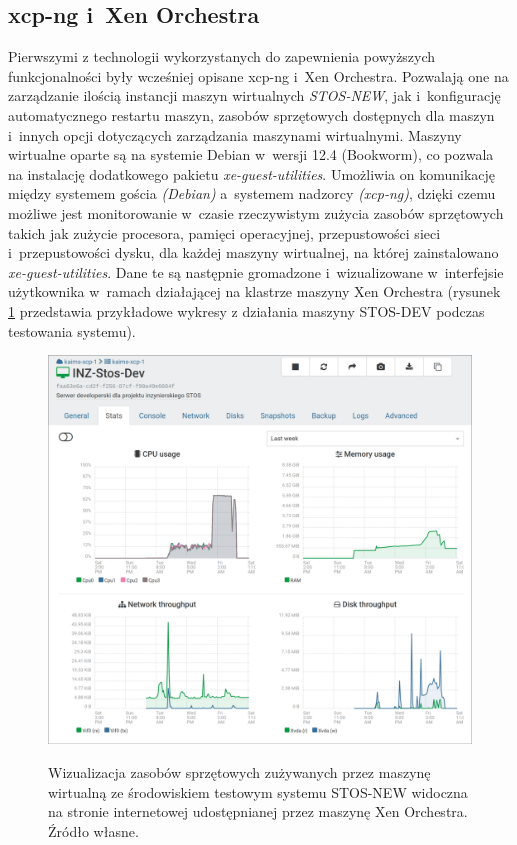 \subsection{xcp-ng i~Xen Orchestra}
Pierwszymi z technologii wykorzystanych do zapewnienia powyższych funkcjonalności były wcześniej opisane xcp-ng i~Xen Orchestra. Pozwalają one na zarządzanie ilością instancji maszyn wirtualnych \textit{STOS-NEW}, jak i~konfigurację automatycznego restartu maszyn, zasobów sprzętowych dostępnych dla maszyn i~innych opcji dotyczących zarządzania maszynami wirtualnymi\cite{xoa, xcp}. Maszyny wirtualne oparte są na systemie Debian w~wersji 12.4 (Bookworm), co pozwala na instalację dodatkowego pakietu \textit{xe-guest-utilities}\cite{xe-guest}. Umożliwia on komunikację między systemem gościa \textit{(Debian)} a~systemem nadzorcy \textit{(xcp-ng)}, dzięki czemu możliwe jest monitorowanie w~czasie rzeczywistym zużycia zasobów sprzętowych takich jak zużycie procesora, pamięci operacyjnej, przepustowości sieci i~przepustowości dysku, dla każdej maszyny wirtualnej, na której zainstalowano \textit{xe-guest-utilities}. Dane te są następnie gromadzone i~wizualizowane w~interfejsie użytkownika w~ramach działającej na klastrze maszyny Xen Orchestra (rysunek \ref{xcpGuest} przedstawia przykładowe wykresy z działania maszyny STOS-DEV podczas testowania systemu).
\begin{figure}[!h]
	\begin{center}
		\resizebox{0.9\textwidth}{!} {
			\includegraphics{img/4/xe-dashboard.png}
		}
		\caption[Dashboard Xen Orchestra]{Wizualizacja zasobów sprzętowych zużywanych przez maszynę wirtualną ze środowiskiem testowym systemu STOS-NEW widoczna na stronie internetowej udostępnianej przez maszynę Xen Orchestra. Źródło własne.}
		\label{xcpGuest}
	\end{center}
\end{figure}
